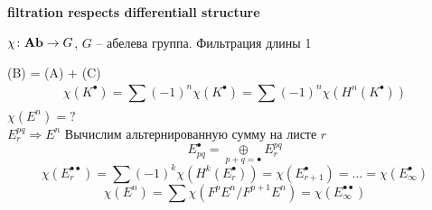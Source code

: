 \documentclass[../main.tex]{subfiles}
\begin{document}
\textbf{filtration respects differentiall structure}
\begin{to_ex}
$\chi \colon \mathbf{Ab} \to G$, $G$ -- абелева группа. 
Фильтрация длины 1
\bee
{}
\qquad \chi(B) = \chi(A) + \chi(C)
\eee
\[
\chi (K^\bullet) = \sum_{}^{}(-1)^n \chi (K^\bullet) = \sum (-1)^n \chi (H^n(K^\bullet))
\]
$\chi (E^n) = ?$\\
$E^{pq}_r \Rightarrow E^n$
Вычислим альтернированную сумму на листе $r$
\[E_{pq}^{\bullet} = \underset{p+q = \bullet}{\oplus} E_r^{pq}\]
\[\chi (E^{\bullet \bullet}_r) = \sum (-1)^k \chi(H^k(E_r^{\bullet})) = \chi(E_{r+1}^{\bullet}) =\ldots = \chi(E_{\infty}^{\bullet})\]
\[\chi(E^n) = \sum \chi (F^pE^n / F^{p+1}E^n) = \chi(E^{\bullet \bullet}_{\infty})\]
\end{to_ex}
\end{document}
